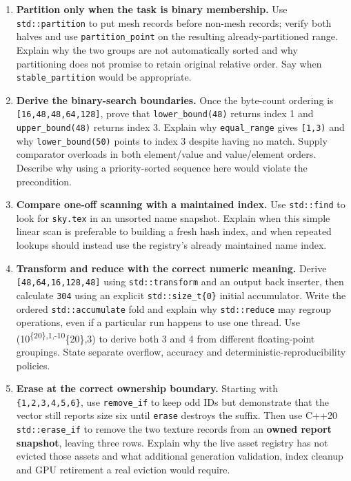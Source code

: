 \begin{enumerate}
\item
  \textbf{Partition only when the task is binary membership.} Use \texttt{std::partition} to put mesh records before non-mesh records; verify both halves and use \texttt{partition\_point} on the resulting already-partitioned range. Explain why the two groups are not automatically sorted and why partitioning does not promise to retain original relative order. Say when \texttt{stable\_partition} would be appropriate.
\item
  \textbf{Derive the binary-search boundaries.} Once the byte-count ordering is \texttt{{[}16,48,48,64,128{]}}, prove that \texttt{lower\_bound(48)} returns index 1 and \texttt{upper\_bound(48)} returns index 3. Explain why \texttt{equal\_range} gives \texttt{{[}1,3)} and why \texttt{lower\_bound(50)} points to index 3 despite having no match. Supply comparator overloads in both element/value and value/element orders. Describe why using a priority-sorted sequence here would violate the precondition.
\item
  \textbf{Compare one-off scanning with a maintained index.} Use \texttt{std::find} to look for \texttt{sky.tex} in an unsorted name snapshot. Explain when this simple linear scan is preferable to building a fresh hash index, and when repeated lookups should instead use the registry's already maintained name index.
\item
  \textbf{Transform and reduce with the correct numeric meaning.} Derive \texttt{{[}48,64,16,128,48{]}} using \texttt{std::transform} and an output back inserter, then calculate \texttt{304} using an explicit \texttt{std::size\_t\{0\}} initial accumulator. Write the ordered \texttt{std::accumulate} fold and explain why \texttt{std::reduce} may regroup operations, even if a particular run happens to use one thread. Use (10\textsuperscript{\{20\},1,-10}\{20\},3) to derive both 3 and 4 from different floating-point groupings. State separate overflow, accuracy and deterministic-reproducibility policies.
\item
  \textbf{Erase at the correct ownership boundary.} Starting with \texttt{\{1,2,3,4,5,6\}}, use \texttt{remove\_if} to keep odd IDs but demonstrate that the vector still reports size six until \texttt{erase} destroys the suffix. Then use C++20 \texttt{std::erase\_if} to remove the two texture records from an \textbf{owned report snapshot}, leaving three rows. Explain why the live asset registry has not evicted those assets and what additional generation validation, index cleanup and GPU retirement a real eviction would require.
\end{enumerate}

